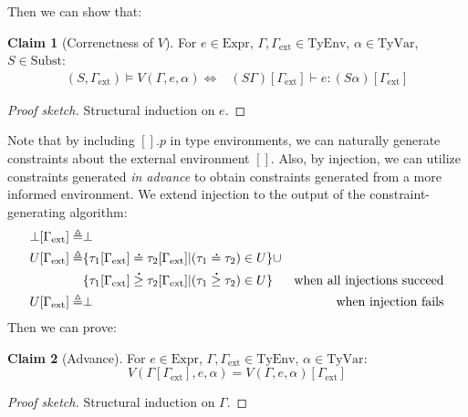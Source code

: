 \documentclass{article}
\theoremstyle{definition}
\newtheorem{clm}{Claim}[section]
\newcommand*{\A}[1]{\overset{\,_{\mbox{\Large .}}}{#1}}
\newcommand*{\Expr}{\text{Expr}}
\newcommand*{\TyEnv}{\text{TyEnv}}
\newcommand*{\TyVar}{\text{TyVar}}
\newcommand*{\Subst}{\text{Subst}}
\newcommand*{\external}{\Gamma_{\text{ext}}}
\begin{document}
Then we can show that:
\begin{clm}[Correnctness of $V$]
	For $e\in\Expr$, $\Gamma,\external\in\TyEnv$, $\alpha\in\TyVar$, $S\in\Subst$:
	\begin{align*}
		(S,\external)\vDash V(\Gamma,e,\alpha) \Leftrightarrow & (S\Gamma)[\external]\vdash e:(S\alpha)[\external]
	\end{align*}
\end{clm}
\begin{proof}[Proof sketch]
	Structural induction on $e$.
\end{proof}

Note that by including $[].p$ in type environments, we can naturally generate constraints about the external environment $[]$.
Also, by injection, we can utilize constraints generated \emph{in advance} to obtain constraints generated from a more informed environment.
We extend injection to the output of the constraint-generating algorithm:
\begin{align*}
	\bot[\external] \triangleq & \bot                                                                                                          \\
	U[\external]    \triangleq & \{\tau_1[\external]\A{=}\tau_2[\external]|(\tau_1\A{=}\tau_2)\in U\}\cup                                      \\
	                           & \{\tau_1[\external]\A{\ge}\tau_2[\external]|(\tau_1\A{\ge}\tau_2)\in U\} & \text{when all injections succeed} \\
	U[\external]    \triangleq & \bot                                                                     & \text{when injection fails}
\end{align*}
Then we can prove:
\begin{clm}[Advance]
	For $e\in\Expr$, $\Gamma,\external\in\TyEnv$, $\alpha\in\TyVar$:
	\[V(\Gamma[\external],e,\alpha)=V(\Gamma,e,\alpha)[\external]\]
\end{clm}
\begin{proof}[Proof sketch]
	Structural induction on $\Gamma$.
\end{proof}
\end{document}
